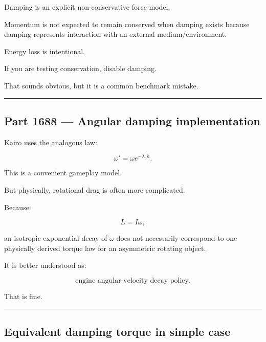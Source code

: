 \hypertarget{06-engine-ii-ch039-damping-removes-momentum-and-energy-intentionally}{}

Damping is an explicit non-conservative force model.

Momentum is not expected to remain conserved when damping exists because damping represents interaction with an external medium/environment.

Energy loss is intentional.

If you are testing conservation, disable damping.

That sounds obvious, but it is a common benchmark mistake.

\begin{center}\rule{0.5\linewidth}{0.5pt}\end{center}

\subsection{Part 1688 --- Angular damping implementation}\label{06-engine-ii-ch039-part-1688-angular-damping-implementation}

\hypertarget{06-engine-ii-ch039-part-1688-angular-damping-implementation}{}

Kairo uses the analogous law:

\[
\boxed{
\omega'
=
\omega e^{-\lambda_ah}.
}
\]

This is a convenient gameplay model.

But physically, rotational drag is often more complicated.

Because:

\[
L=I\omega,
\]

an isotropic exponential decay of \(\omega\) does not necessarily correspond to one physically derived torque law for an asymmetric rotating object.

It is better understood as:

\[
\boxed{
\text{engine angular-velocity decay policy}.
}
\]

That is fine.

\begin{center}\rule{0.5\linewidth}{0.5pt}\end{center}

\subsection{Equivalent damping torque in simple case}\label{06-engine-ii-ch039-equivalent-damping-torque-in-simple-case}

